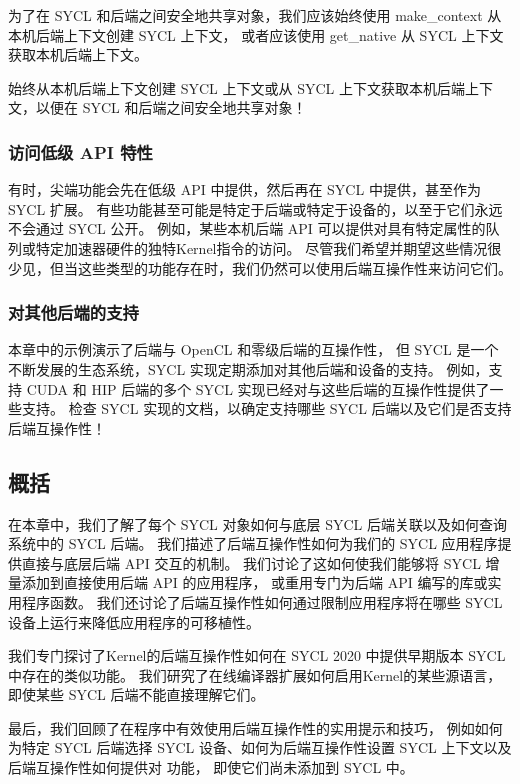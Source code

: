 为了在 SYCL 和后端之间安全地共享对象，我们应该始终使用 make\_context 从本机后端上下文创建 SYCL 上下文，
或者应该使用 get\_native 从 SYCL 上下文获取本机后端上下文。

\begin{remark}
	始终从本机后端上下文创建 SYCL 上下文或从 SYCL 上下文获取本机后端上下文，以便在 SYCL 和后端之间安全地共享对象！
\end{remark}

\subsubsection{访问低级 API 特性}
有时，尖端功能会先在低级 API 中提供，然后再在 SYCL 中提供，甚至作为 SYCL 扩展。 
有些功能甚至可能是特定于后端或特定于设备的，以至于它们永远不会通过 SYCL 公开。 
例如，某些本机后端 API 可以提供对具有特定属性的队列或特定加速器硬件的独特Kernel指令的访问。 
尽管我们希望并期望这些情况很少见，但当这些类型的功能存在时，我们仍然可以使用后端互操作性来访问它们。

\subsubsection{对其他后端的支持}
本章中的示例演示了后端与 OpenCL 和零级后端的互操作性，
但 SYCL 是一个不断发展的生态系统，SYCL 实现定期添加对其他后端和设备的支持。 
例如，支持 CUDA 和 HIP 后端的多个 SYCL 实现已经对与这些后端的互操作性提供了一些支持。 
检查 SYCL 实现的文档，以确定支持哪些 SYCL 后端以及它们是否支持后端互操作性！

\subsection{概括}
在本章中，我们了解了每个 SYCL 对象如何与底层 SYCL 后端关联以及如何查询系统中的 SYCL 后端。 
我们描述了后端互操作性如何为我们的 SYCL 应用程序提供直接与底层后端 API 交互的机制。 
我们讨论了这如何使我们能够将 SYCL 增量添加到直接使用后端 API 的应用程序，
或重用专门为后端 API 编写的库或实用程序函数。 
我们还讨论了后端互操作性如何通过限制应用程序将在哪些 SYCL 设备上运行来降低应用程序的可移植性。

我们专门探讨了Kernel的后端互操作性如何在 SYCL 2020 中提供早期版本 SYCL 中存在的类似功能。 
我们研究了在线编译器扩展如何启用Kernel的某些源语言，即使某些 SYCL 后端不能直接理解它们。

最后，我们回顾了在程序中有效使用后端互操作性的实用提示和技巧，
例如如何为特定 SYCL 后端选择 SYCL 设备、如何为后端互操作性设置 SYCL 上下文以及后端互操作性如何提供对 功能，
即使它们尚未添加到 SYCL 中。